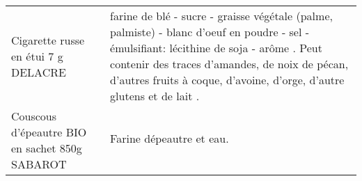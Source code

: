 \begin{longtable}{p{5cm}p{10cm}}
                                                                      Cigarette russe en étui 7 g DELACRE &                                                                                                                                                                                                                                                                                                                                                                                                                                                                                                                                                                                                                                                                                                                                                                      farine de blé - sucre - graisse végétale (palme, palmiste) - blanc d'oeuf en poudre - sel - émulsifiant: lécithine de soja - arôme .  Peut contenir des traces d'amandes, de noix de pécan, d'autres fruits à coque, d'avoine, d'orge, d'autre glutens et de lait . \\
                                                           Couscous d'épeautre BIO en sachet 850g SABAROT &                                                                                                                                                                                                                                                                                                                                                                                                                                                                                                                                                                                                                                                                                                                                                                                                                                                                                                                                                                                                                Farine dépeautre et eau. \\

\end{longtable}
